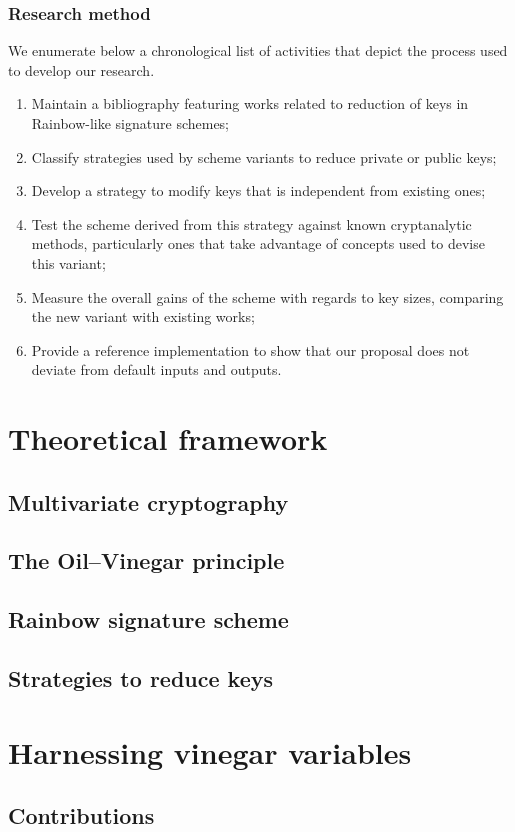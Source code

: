\documentclass[openright]{report}
\begin{document}
\subsection{Research method}

We enumerate below a chronological list of activities that depict the process used to develop our research.

\begin{enumerate}[label=(\roman*), itemsep=1pt]
    \item Maintain a bibliography featuring works related to reduction of keys in Rainbow-like signature schemes;
    \item Classify strategies used by scheme variants to reduce private or public keys;
    \item Develop a strategy to modify keys that is independent from existing ones;
    \item Test the scheme derived from this strategy against known cryptanalytic methods, particularly ones that take advantage of concepts used to devise this variant;
    \item Measure the overall gains of the scheme with regards to key sizes, comparing the new variant with existing works;
    \item Provide a reference implementation to show that our proposal does not deviate from default inputs and outputs.
\end{enumerate}

\chapter{Theoretical framework}

\section{Multivariate cryptography}

\section{The Oil--Vinegar principle}

\section{Rainbow signature scheme}

\section{Strategies to reduce keys}

\chapter{Harnessing vinegar variables}

\section{Contributions}



\end{document}
